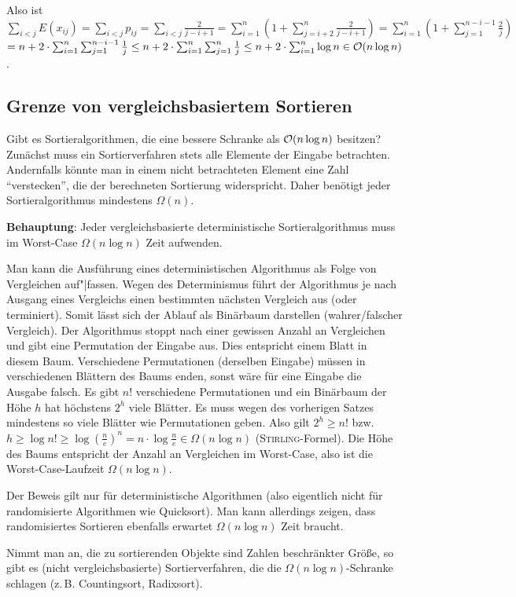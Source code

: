 \begin{Beweis}
    Also ist $\sum_{i < j} E(x_{ij}) = \sum_{i < j} p_{ij}
    = \sum_{i < j} \frac{2}{j - i + 1}
    = \sum_{i=1}^n (1 + \sum_{j=i+2}^n \frac{2}{j - i + 1})
    = \sum_{i=1}^n (1 + \sum_{j=1}^{n-i-1} \frac{2}{j})$ \\
    $= n + 2 \cdot \sum_{i=1}^n \sum_{j=1}^{n-i-1} \frac{1}{j}
    \le n + 2 \cdot \sum_{i=1}^n \sum_{j=1}^{n} \frac{1}{j}
    \le n + 2 \cdot \sum_{i=1}^n \log n \in \mathcal{O}(n \log n)$.
\end{Beweis}


\subsection{%
    Grenze von vergleichsbasiertem Sortieren%
}
\label{ss_grenze_von_vergleichsbasiertem_sortieren}

Gibt es Sortieralgorithmen, die eine bessere Schranke als $\mathcal{O}(n \log n)$
besitzen?
Zunächst muss ein Sortierverfahren stets alle Elemente der Eingabe betrachten.
Andernfalls könnte man in einem nicht betrachteten Element eine Zahl
"`verstecken"', die der berechneten Sortierung widerspricht.
Daher benötigt jeder Sortieralgorithmus mindestens $\Omega(n)$.

\textbf{Behauptung}: Jeder vergleichsbasierte deterministische
Sortieralgorithmus muss im Worst-Case $\Omega(n \log n)$ Zeit aufwenden.

\begin{Beweis}
    Man kann die Ausführung eines deterministischen Algorithmus als Folge
    von Vergleichen auf"|fassen.
    Wegen des Determinismus führt der Algorithmus je nach Ausgang eines
    Vergleichs einen bestimmten nächsten Vergleich aus (oder terminiert).
    Somit lässt sich der Ablauf als Binärbaum darstellen (wahrer/falscher
    Vergleich).
    Der Algorithmus stoppt nach einer gewissen Anzahl an Vergleichen und gibt
    eine Permutation der Eingabe aus.
    Dies entspricht einem Blatt in diesem Baum.
    Verschiedene Permutationen (derselben Eingabe) müssen in verschiedenen
    Blättern des Baums enden, sonst wäre für eine Eingabe die Ausgabe falsch.
    Es gibt $n!$ verschiedene Permutationen und ein Binärbaum der Höhe $h$ hat
    höchstens $2^h$ viele Blätter.
    Es muss wegen des vorherigen Satzes mindestens so viele Blätter wie
    Permutationen geben.
    Also gilt $2^h \ge n!$ bzw.
    $h \ge \log n! \ge \log \left(\frac{n}{e}\right)^n
    = n \cdot \log \frac{n}{e} \in \Omega(n \log n)$
    (\textsc{Stirling}-Formel).
    Die Höhe des Baums entspricht der Anzahl an Vergleichen im Worst-Case, also
    ist die Worst-Case-Laufzeit $\Omega(n \log n)$.
\end{Beweis}

Der Beweis gilt nur für deterministische Algorithmen (also eigentlich nicht
für randomisierte Algorithmen wie Quicksort).
Man kann allerdings zeigen, dass randomisiertes Sortieren ebenfalls
erwartet $\Omega(n \log n)$ Zeit braucht.

Nimmt man an, die zu sortierenden Objekte sind Zahlen beschränkter Größe,
so gibt es (nicht vergleichsbasierte) Sortierverfahren, die die
$\Omega(n \log n)$-Schranke schlagen (z.\,B. Countingsort, Radixsort).

\pagebreak

